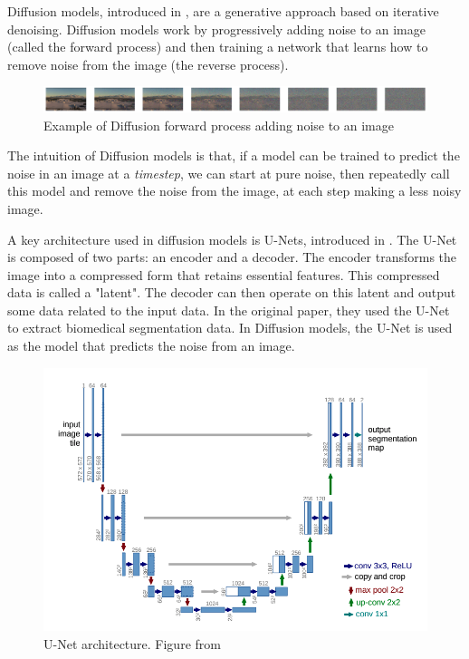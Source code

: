 Diffusion models, introduced in \cite{ho_denoising_2020}, are a generative approach based on iterative denoising. Diffusion models work by progressively adding noise to an image (called the forward process) and then training a network that learns how to remove noise from the image (the reverse process).

\begin{figure}[htbp]
\centering
\includegraphics[width=1.2\textwidth]{figures/noise_to_image.png}
\caption{Example of Diffusion forward process adding noise to an image}
\label{fig:noise_to_image}
\end{figure}

The intuition of Diffusion models is that, if a model can be trained to predict
the noise in an image at a \emph{timestep}, we can start at pure noise, then repeatedly call this model and remove the noise from the image, at each step making a less noisy image.

A key architecture used in diffusion models is U-Nets, introduced in \cite{ronneberger_u-net_2015}. The U-Net is composed of two parts: an encoder and a decoder. The encoder transforms the image into a compressed form that retains essential features. This compressed data is called a "latent". The decoder can then operate on this latent and output some data related to the input data. In the original paper, they used the U-Net to extract biomedical segmentation data. In Diffusion models, the U-Net is used as the model that predicts the noise from an image.

\begin{figure}[htbp]
\centering
\includegraphics[width=1.0\textwidth]{figures/unet_architecture.png}
\caption{U-Net architecture. Figure from \cite{ronneberger_u-net_2015}}
\label{fig:unet_architecture}
\end{figure}

